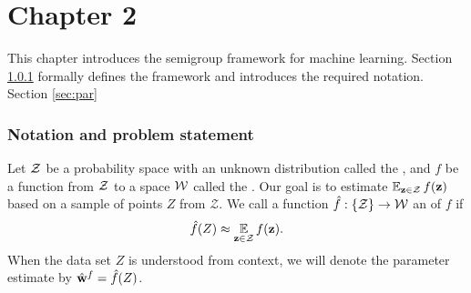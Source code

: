\documentclass[thesis.tex]{subfiles}
\newcommand{\set}[1]{\mathcal {#1}}
\begin{document}
\chapter{Chapter 2}


\noindent


\noindent
This chapter introduces the semigroup framework for machine learning.
Section \ref{sec:notation} formally defines the framework and introduces the required notation.
Section \ref{sec:par}

\subsection{Notation and problem statement}
\label{sec:notation}
Let ${\mathcal Z}$ be a probability space with an unknown distribution called the ,
and $f$ be a function from ${\mathcal Z}$ to a space ${\mathcal W}$ called the .
Our goal is to estimate $\operatorname*{\mathbb E}_{\mathbf z\in{\mathcal Z}} f(\mathbf z)$ based on a sample of points $Z$ from $\set Z$.
We call a function $\hat f : \{{\mathcal Z}\} \to {\mathcal W}$ an  of $f$ if
\begin{equation}
    \label{eq:notation:fhat}
    \hat f(Z) \approx \operatorname*{\mathbb E}_{\mathbf z\in{\mathcal Z}}f(\mathbf z)
    .
\end{equation}
When the data set $Z$ is understood from context,
we will denote the parameter estimate by ${\hat{\mathbf w}}^f=\hat f(Z)$.
\end{document}
